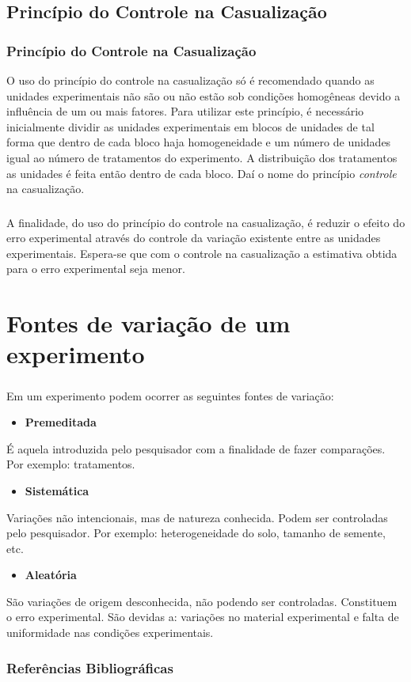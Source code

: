 \documentclass[14pt,aspectratio=1610]{beamer}
\begin{document}
\subsection{Princípio do Controle na Casualização}
\begin{frame}{}
\frametitle{Princípio do Controle na Casualização}
\begin{block}{}
\justifying
O uso do princípio do controle na casualização só é recomendado quando as unidades experimentais não são ou não estão sob condições homogêneas devido a influência de um ou mais fatores. Para utilizar este princípio, é necessário inicialmente dividir as unidades experimentais em blocos de unidades de tal forma que dentro de cada bloco haja homogeneidade e um número de unidades igual ao número de tratamentos do experimento. A distribuição dos tratamentos as unidades é feita então dentro de cada bloco. Daí o nome do princípio {\it controle} na casualização.
\end{block}
\end{frame}

\begin{frame}{}
\frametitle{}
\begin{block}{}
\justifying
A finalidade, do uso do princípio do controle na casualização, é reduzir o efeito do
erro experimental através do controle da variação existente entre as unidades experimentais. Espera-se que com o controle na casualização a estimativa obtida para o erro experimental seja menor.
\end{block}
\end{frame}

\section{Fontes de variação de um experimento}
\begin{frame}{}
\frametitle{}
\begin{block}{Em um experimento podem ocorrer as seguintes fontes de variação:}
\begin{itemize}
\item {\bf Premeditada}
\end{itemize}
É aquela introduzida pelo pesquisador com a finalidade de fazer comparações. Por
exemplo: tratamentos.\pause
\begin{itemize}
\item {\bf Sistemática}
\end{itemize}
Variações não intencionais, mas de natureza conhecida. Podem ser controladas pelo pesquisador. Por exemplo: heterogeneidade do solo, tamanho de semente, etc.\pause
\begin{itemize}
\item {\bf Aleatória}
\end{itemize}
São variações de origem desconhecida, não podendo ser controladas. Constituem
o erro experimental. São devidas a: variações no material experimental e falta de uniformidade nas condições experimentais.
\nocite{calegare}
\nocite{ivo}
\end{block}
\end{frame}

\begin{frame}[allowframebreaks]
\frametitle{Referências Bibliográficas}

\end{frame}
\end{document}
